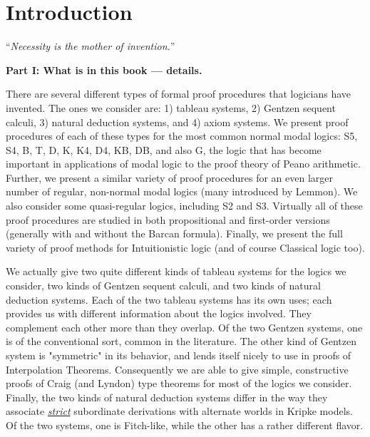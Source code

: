 \setcounter{page}{1} %

\chapter*{Introduction}



\begin{center}
    ``\textit{Necessity is the mother of invention.}''
\end{center}


\noindent
\textbf{Part I: What is in this book --- details.}

There are several different types of formal proof procedures that logicians have invented.
% 
The ones we consider are: 1) tableau systems, 2) Gentzen sequent
calculi, 3) natural deduction systems, and 4) axiom
systems.
% 
We present proof procedures of each of these types for the most common normal modal logics: 
S5, S4, B, T, D, K, K4, D4, KB, DB, 
and also G, the logic that has
become important in applications of modal logic to the proof theory of Peano arithmetic.
% 
% 
Further, we present a similar variety of proof procedures for an even larger number of regular, non-normal modal logics (many introduced
by Lemmon).
% 
We also consider some quasi-regular logics,
including S2 and S3.
% 
Virtually all of these proof procedures are studied in both propositional and first-order versions (generally with and without the Barcan formula).
% 
Finally, we present the full variety of proof methods for Intuitionistic logic (and of course Classical logic too).



We actually give two quite different kinds of tableau systems for the logics we consider, two kinds of Gentzen sequent calculi, and two kinds of natural deduction systems.
% 
Each of the two tableau systems has its own uses;
each provides us with different information about the logics involved.
% 
They complement each other more than they overlap.
% 
Of the two Gentzen systems, one is of the conventional sort, 
common in the literature.
% 
The other kind of Gentzen system is "symmetric" in its behavior, 
and lends itself nicely to use in proofs of Interpolation Theorems.
% 
Consequently we are able to give simple,
constructive proofs of Craig (and Lyndon) type theorems for most of the logics we consider. 
% 
Finally, 
the two kinds of natural deduction systems differ in the way they associate \underline{\textit{strict}} subordinate derivations with alternate worlds in Kripke models. 
% 
% 
Of the two systems, 
one is Fitch-like,
while the other has a rather different flavor.



